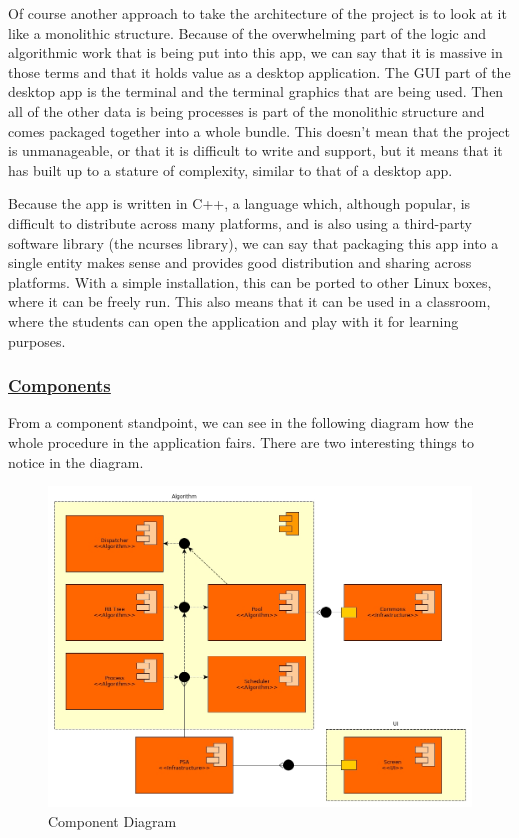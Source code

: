 \documentclass{article}
\begin{document}
Of course another approach to take the architecture of the project is to look at it like a monolithic structure. Because of the overwhelming part of the logic and algorithmic work that is being put into this app, we can say that it is massive in those terms and that it holds value as a desktop application. The GUI part of the desktop app is the terminal and the terminal graphics that are being used. Then all of the other data is being processes is part of the monolithic structure and comes packaged together into a whole bundle. This doesn't mean that the project is unmanageable, or that it is difficult to write and support, but it means that it has built up to a stature of complexity, similar to that of a desktop app.

Because the app is written in C++, a language which, although popular, is difficult to distribute across many platforms, and is also using a third-party software library (the ncurses library), we can say that packaging this app into a single entity makes sense and provides good distribution and sharing across platforms. With a simple installation, this can be ported to other Linux boxes, where it can be freely run. This also means that it can be used in a classroom, where the students can open the application and play with it for learning purposes.

\subsubsection{\underline{Components}}

From a component standpoint, we can see in the following diagram how the whole procedure in the application fairs. There are two interesting things to notice in the diagram.

\begin{figure}[H]
  \centering
  \includegraphics[width=\linewidth]{./pics/component.jpg}
  \caption{Component Diagram}
  \label{fig:Component Diagram}
\end{figure}
\end{document}
